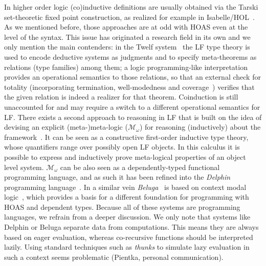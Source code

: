 \documentclass[preprint]{elsarticle}
\newcommand{\Momega}{\mathcal{M}_{\omega}}
\begin{document}
In higher order logic (co)inductive definitions are usually obtained
via the Tarski set-theoretic fixed point construction, as realized for
example in Isabelle/HOL~\cite{Paulson97}.  As we mentioned before,
those approaches are at odd with HOAS even at the level of the
syntax. This issue has originated a research field in its own and we
only mention the main contenders: in the {Twelf}
system~\cite{Schurmann09}
the LF type theory is used to encode deductive systems as judgments
and to specify meta-theorems as relations (type families) among them;
a logic programming-like interpretation provides an operational
semantics to those relations, so that an external check for totality
(incorporating termination, well-modedness and
coverage~\cite{SchurmannP03,Pientka05}) verifies that the given
relation is indeed a realizer for that theorem. Coinduction is still
unaccounted for and may require a switch to a different operational
semantics for LF.  There exists a second approach to reasoning in LF
that is built on the idea of devising an explicit (meta-)meta-logic
($\Momega$) for reasoning (inductively) about the
framework~\cite{S00}. It can be seen as a constructive first-order
inductive type theory, whose quantifiers range over possibly open LF
objects.  In this calculus it is possible to express and inductively
prove meta-logical properties of an object level system.  $\Momega$
can be also seen as a dependently-typed functional programming
language, and as such it has been refined into the
\emph{Delphin} programming language~\cite{PosSch08}.  In a similar
vein \emph{Beluga}~\cite{Pientka08} is based on context modal
logic~\cite{NanevskiTOCL}, which provides a basis for a different
foundation for programming with HOAS and dependent types. Because all
of these systems are programming languages, we refrain from a deeper
discussion. We only note that systems like Delphin or Beluga separate
data from computations. This means they are always based on eager
evaluation, whereas co-recursive functions should be interpreted
lazily.  Using standard techniques such as \emph{thunks} to simulate
lazy evaluation in such a context seems problematic (Pientka, personal
communication).
\end{document}
